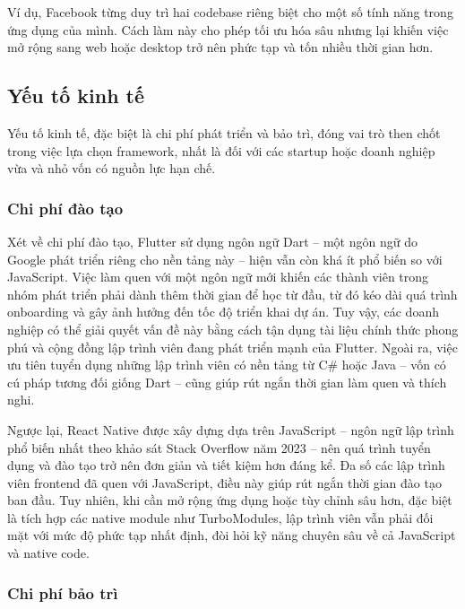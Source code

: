 \vspace{0.5em}

\indent Ví dụ, Facebook từng duy trì hai codebase riêng biệt cho một số tính năng trong ứng dụng của mình. Cách làm này cho phép tối ưu hóa sâu nhưng lại khiến việc mở rộng sang web hoặc desktop trở nên phức tạp và tốn nhiều thời gian hơn.



\subsection{Yếu tố kinh tế}


    Yếu tố kinh tế, đặc biệt là chi phí phát triển và bảo trì, đóng vai trò then chốt trong việc lựa chọn framework, nhất là đối với các startup hoặc doanh nghiệp vừa và nhỏ vốn có nguồn lực hạn chế.

\subsubsection{Chi phí đào tạo}


    Xét về chi phí đào tạo, Flutter sử dụng ngôn ngữ Dart – một ngôn ngữ do Google phát triển riêng cho nền tảng này – hiện vẫn còn khá ít phổ biến so với JavaScript. Việc làm quen với một ngôn ngữ mới khiến các thành viên trong nhóm phát triển phải dành thêm thời gian để học từ đầu, từ đó kéo dài quá trình onboarding và gây ảnh hưởng đến tốc độ triển khai dự án. Tuy vậy, các doanh nghiệp có thể giải quyết vấn đề này bằng cách tận dụng tài liệu chính thức phong phú và cộng đồng lập trình viên đang phát triển mạnh của Flutter. Ngoài ra, việc ưu tiên tuyển dụng những lập trình viên có nền tảng từ C\# hoặc Java – vốn có cú pháp tương đối giống Dart – cũng giúp rút ngắn thời gian làm quen và thích nghi.

    \vspace{0.5em}

    Ngược lại, React Native được xây dựng dựa trên JavaScript – ngôn ngữ lập trình phổ biến nhất theo khảo sát Stack Overflow năm 2023 – nên quá trình tuyển dụng và đào tạo trở nên đơn giản và tiết kiệm hơn đáng kể. Đa số các lập trình viên frontend đã quen với JavaScript, điều này giúp rút ngắn thời gian đào tạo ban đầu. Tuy nhiên, khi cần mở rộng ứng dụng hoặc tùy chỉnh sâu hơn, đặc biệt là tích hợp các native module như TurboModules, lập trình viên vẫn phải đối mặt với mức độ phức tạp nhất định, đòi hỏi kỹ năng chuyên sâu về cả JavaScript và native code.

\subsubsection{Chi phí bảo trì}


